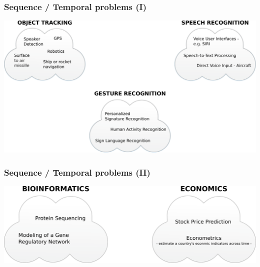
\begin{frame}
  \frametitle{Sequence / Temporal problems (I)}
  \includegraphics[width=\textwidth]{images/time_series_problems_1.pdf}
\end{frame}

\begin{frame}
  \frametitle{Sequence / Temporal problems (II)}
  \includegraphics[width=\textwidth]{images/time_series_problems_2.pdf}
\end{frame}


